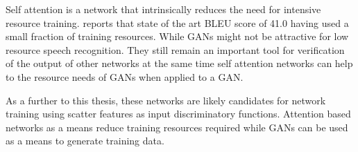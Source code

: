 Self attention is a network that intrinsically reduces the need for intensive resource training.  \cite{vaswani2017attention} reports that state of the art BLEU score of 41.0 having used a small fraction of training resources.  While GANs might not be attractive for low resource speech recognition.  They still remain an important tool for verification of the output of other networks at the same time self attention networks can help to the resource needs of GANs when applied to a GAN.

As a further to this thesis, these networks are likely candidates for network training using scatter features as input discriminatory functions.  Attention based networks as a means reduce training resources required while GANs can be used as a means to generate training data.